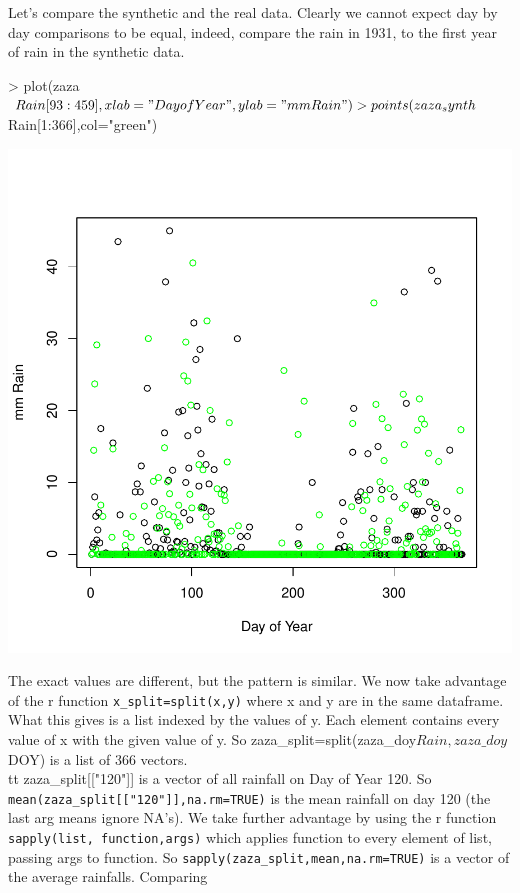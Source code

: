 \documentclass{article}
\begin{document}
Let's compare the synthetic and the real data.  Clearly we cannot expect
day by day comparisons to be equal, indeed, compare the rain in 1931, to the first year of rain in the synthetic data.

\begin{Schunk}
\begin{Sinput}
> plot(zaza$Rain[93:459],xlab="Day of Year",ylab="mm Rain")
> points(zaza_synth$Rain[1:366],col="green")
\end{Sinput}
\end{Schunk}
\includegraphics{climate_vignette-017}

The exact values are different, but the pattern is similar.
We now take advantage of the r function {\tt x\_split=split(x,y)}
where x and y are in the same dataframe.  What this gives is a list
indexed by the values of y.  Each element contains every value
of x with the given value of y.  So {zaza\_split=split(zaza\_doy$Rain,zaza\_doy$DOY)}
is a list of 366 vectors. {\\tt zaza\_split[["120"]]} is a vector of all rainfall
on Day of Year 120.  So {\tt mean(zaza\_split[["120"]],na.rm=TRUE)} is the mean
rainfall on day 120 (the last arg means ignore NA's).  We take further advantage by using the r function {\tt sapply(list, function,args)} which applies  function
to every element of list, passing args to function.  So
{\tt sapply(zaza\_split,mean,na.rm=TRUE)} is a vector of the average rainfalls.
Comparing
\end{document}
